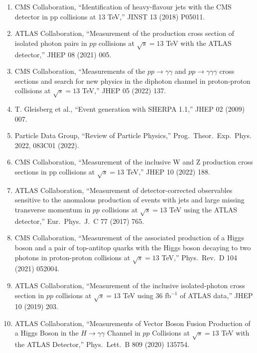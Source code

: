 \documentclass{article}
\begin{document}
\begin{enumerate}
    \item CMS Collaboration, ``Identification of heavy-flavour jets with the CMS detector in pp collisions at 13 TeV,'' JINST 13 (2018) P05011.
    
    \item ATLAS Collaboration, ``Measurement of the production cross section of isolated photon pairs in $pp$ collisions at $\sqrt{s} = 13$ TeV with the ATLAS detector,'' JHEP 08 (2021) 005.
    
    \item CMS Collaboration, ``Measurements of the $pp \to \gamma\gamma$ and $pp \to \gamma\gamma\gamma$ cross sections and search for new physics in the diphoton channel in proton-proton collisions at $\sqrt{s} = 13$ TeV,'' JHEP 05 (2022) 137.
    
    \item T. Gleisberg et al., ``Event generation with SHERPA 1.1,'' JHEP 02 (2009) 007.
    
    \item Particle Data Group, ``Review of Particle Physics,'' Prog.\ Theor.\ Exp.\ Phys. 2022, 083C01 (2022).
    
    \item CMS Collaboration, ``Measurement of the inclusive W and Z production cross sections in pp collisions at $\sqrt{s} = 13$ TeV,'' JHEP 10 (2022) 188.
    
    \item ATLAS Collaboration, ``Measurement of detector-corrected observables sensitive to the anomalous production of events with jets and large missing transverse momentum in $pp$ collisions at $\sqrt{s} = 13$ TeV using the ATLAS detector,'' Eur.\ Phys.\ J.\ C 77 (2017) 765.
    
    \item CMS Collaboration, ``Measurement of the associated production of a Higgs boson and a pair of top-antitop quarks with the Higgs boson decaying to two photons in proton-proton collisions at $\sqrt{s} = 13$ TeV,'' Phys.\ Rev.\ D 104 (2021) 052004.
    
    \item ATLAS Collaboration, ``Measurement of the inclusive isolated-photon cross section in $pp$ collisions at $\sqrt{s} = 13$ TeV using 36 fb$^{-1}$ of ATLAS data,'' JHEP 10 (2019) 203.
    
    \item ATLAS Collaboration, ``Measurements of Vector Boson Fusion Production of a Higgs Boson in the $H \rightarrow \gamma\gamma$ Channel in $pp$ Collisions at $\sqrt{s} = 13$ TeV with the ATLAS Detector,'' Phys.\ Lett.\ B 809 (2020) 135754.
    

\end{enumerate}
\end{document}
